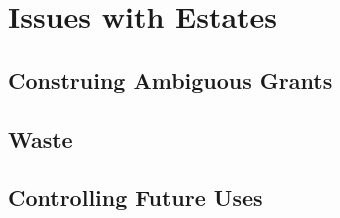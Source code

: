 \chapter{Issues with Estates}

\section{Construing Ambiguous Grants}






\begin{questions}

\end{questions}



\section{Waste}







\begin{questions}

\end{questions}




\section{Controlling Future Uses}





\begin{questions}

\end{questions}




\begin{questions}

\end{questions}




\begin{questions}

\end{questions}

